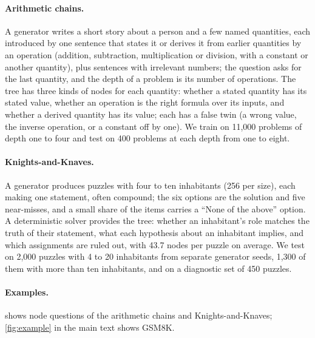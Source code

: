 \documentclass{article}
\begin{document}
\paragraph{Arithmetic chains.} A generator writes a short story about a person and a few named quantities, each
introduced by one sentence that states it or derives it from earlier quantities by an operation (addition,
subtraction, multiplication or division, with a constant or another quantity), plus sentences with irrelevant numbers;
the question asks for the last quantity, and the depth of a problem is its number of operations. The tree has three
kinds of nodes for each quantity: whether a stated quantity has its stated value, whether an operation is the right
formula over its inputs, and whether a derived quantity has its value; each has a false twin (a wrong value, the
inverse operation, or a constant off by one). We train on 11,000 problems of depth one to four and test on 400
problems at each depth from one to eight.

\paragraph{Knights-and-Knaves.} A generator produces puzzles with four to ten inhabitants (256 per size), each making
one statement, often compound; the six options are the solution and five near-misses, and a small share of the
items carries a ``None of the above'' option. A deterministic solver provides the tree: whether an inhabitant's role
matches the truth of their statement, what each hypothesis about an inhabitant implies, and which assignments are
ruled out, with 43.7 nodes per puzzle on average. We test on 2,000 puzzles with 4 to 20 inhabitants from separate
generator seeds, 1,300 of them with more than ten inhabitants, and on a diagnostic set of 450 puzzles.

\paragraph{Examples.}  shows node questions of the arithmetic chains and Knights-and-Knaves;
\cref{fig:example} in the main text shows GSM8K.
\end{document}
